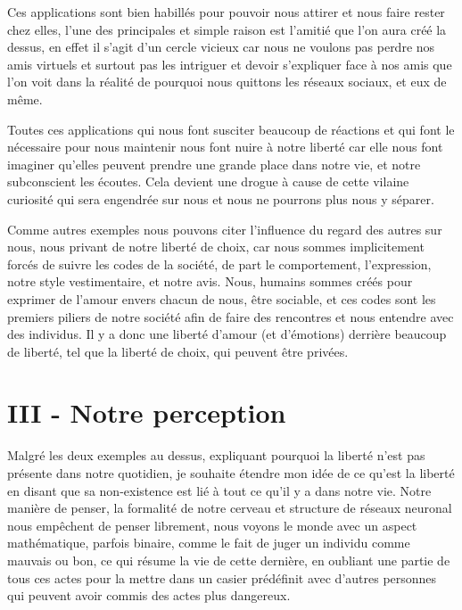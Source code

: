 \documentclass[]{liberty}
\begin{document}
Ces applications sont bien habillés pour pouvoir nous attirer et nous 
faire rester chez elles, l'une des principales et simple raison est l'amitié que l'on aura créé 
la dessus, en effet il s'agit d'un cercle vicieux car nous ne voulons pas perdre nos amis virtuels 
et surtout pas les intriguer et devoir s'expliquer face à nos amis que l'on voit dans la réalité de 
pourquoi nous quittons les réseaux sociaux, et eux de même.\newline 

Toutes ces applications qui nous font susciter beaucoup de réactions et qui font le nécessaire 
pour nous maintenir nous font nuire à notre liberté car elle nous font imaginer qu'elles peuvent 
prendre une grande place dans notre vie, et notre subconscient les écoutes. Cela devient une drogue
à cause de cette vilaine curiosité qui sera engendrée sur nous et nous ne pourrons plus nous y
séparer.\newline 

Comme autres exemples nous pouvons citer l'influence du regard des autres sur nous, nous privant de 
notre liberté de choix, car nous sommes implicitement forcés de suivre les codes de la société, de part
le comportement, l'expression, notre style vestimentaire, et notre avis. Nous, humains sommes créés pour
exprimer de l'amour envers chacun de nous, être sociable, et ces codes sont les premiers piliers de notre
société afin de faire des rencontres et nous entendre avec des individus. Il y a donc une liberté d'amour 
(et d'émotions) derrière beaucoup de liberté, tel que la liberté de choix, qui peuvent être privées.\newline
\section*{III - Notre perception}
Malgré les deux exemples au dessus, expliquant pourquoi la liberté n'est pas présente dans notre
quotidien, je souhaite étendre mon idée de ce qu'est la liberté en disant que sa non-existence 
est lié à tout ce qu'il y a dans notre vie. 
Notre manière de penser, la formalité de notre 
cerveau et structure de réseaux neuronal nous empêchent de penser librement, nous voyons le 
monde avec un aspect mathématique, parfois binaire, comme le fait de juger un individu comme 
mauvais ou bon, ce qui résume la vie de cette dernière, en oubliant une partie de tous ces actes
pour la mettre dans un casier prédéfinit avec d'autres personnes qui peuvent avoir commis des
actes plus dangereux.\newline 
\end{document}

